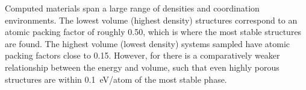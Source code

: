 Computed materials span a large range of densities and coordination environments.
%
%
The lowest volume (highest density) structures correspond to an atomic packing factor of roughly \num{0.50}, which is where the most stable structures are found.
%
The highest volume (lowest density) systems sampled have atomic packing factors close to \num{0.15}.
%
However, for \IrOthree there is a comparatively weaker relationship between the energy and volume, such that even highly porous structures are within \SI{0.1}{\electronvolt}/atom of the most stable phase.
%
%


